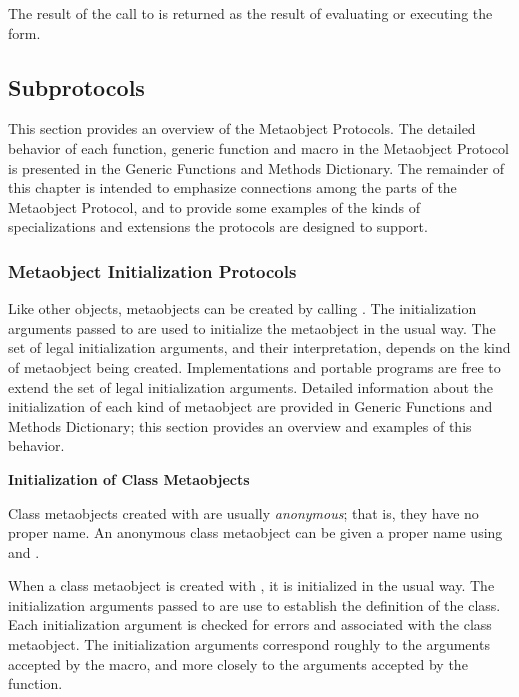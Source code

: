 The result of the call to  is returned as the result of
evaluating or executing the  form.

\subsection{Subprotocols}

This section provides an overview of the Metaobject Protocols. The detailed
behavior of each function, generic function and macro in the Metaobject Protocol
is presented in the Generic Functions and Methods Dictionary. The remainder of
this chapter is intended to emphasize connections among the parts of the
Metaobject Protocol, and to provide some examples of the kinds of
specializations and extensions the protocols are designed to support.

\subsubsection{Metaobject Initialization Protocols}

Like other objects, metaobjects can be created by calling . The
initialization arguments passed to  are used to initialize the
metaobject in the usual way. The set of legal initialization arguments, and
their interpretation, depends on the kind of metaobject being
created. Implementations and portable programs are free to extend the set of
legal initialization arguments. Detailed information about the initialization of
each kind of metaobject are provided in Generic Functions and Methods
Dictionary; this section provides an overview and examples of this behavior. 

\textbf{Initialization of Class Metaobjects}

Class metaobjects created with  are usually \emph{anonymous}; that is,
they have no proper name. An anonymous class metaobject can be given a proper
name using  and . 

When a class metaobject is created with , it is initialized in the
usual way. The initialization arguments passed to  are use to
establish the definition of the class. Each initialization argument is checked
for errors and associated with the class metaobject. The initialization
arguments correspond roughly to the arguments accepted by the  macro,
and more closely to the arguments accepted by the  function. 

